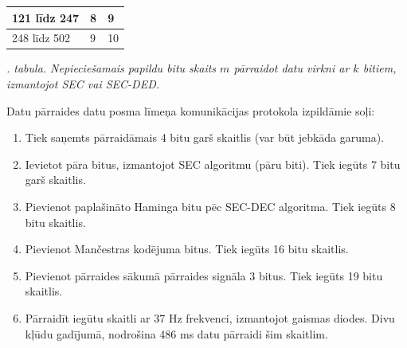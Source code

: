 \documentclass[12pt, a4paper, oneside, openright]{article}
\renewcommand{\thectables}{\arabic{ctables}}
\begin{document}
\begin{samepage}
\begin{table}[h]
\begin{tabular}{|l|l|l|}
121 līdz 247                                                  & 8                                                                                                & 9                                                                                                   \\ \hline
248 līdz 502                                                  & 9                                                                                                & 10                                                                                                  \\ \hline
\end{tabular}
\end{table}
\label{ctables:hamming_1}
\begin{center}
\footnotesize{
\textit{\thectables. tabula. Nepieciešamais papildu bitu skaits $m$ pārraidot datu virkni ar $k$ bitiem, izmantojot SEC vai SEC-DED.}}
\end{center}
\end{samepage}

\par
Datu pārraides datu posma līmeņa komunikācijas protokola izpildāmie soļi:
\begin{enumerate}

\item Tiek saņemts pārraidāmais 4 bitu garš skaitlis (var būt jebkāda garuma).
\item Ievietot pāra bitus, izmantojot SEC algoritmu (pāru biti). Tiek iegūts 7 bitu garš skaitlis.
\item Pievienot paplašināto Haminga bitu pēc SEC-DEC algoritma. Tiek iegūts 8 bitu skaitlis.
\item Pievienot Mančestras kodējuma bitus. Tiek iegūts 16 bitu skaitlis.
\item Pievienot pārraides sākumā pārraides signāla 3 bitus. Tiek iegūts 19 bitu skaitlis.
\item Pārraidīt iegūtu skaitli ar 37 Hz frekvenci, izmantojot gaismas diodes. Divu kļūdu gadījumā, nodrošina 486 ms datu pārraidi šim skaitlim.

\end{enumerate} 
\end{document}
